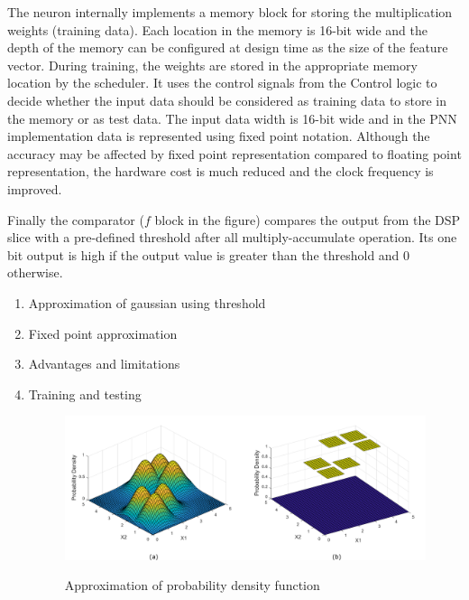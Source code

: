 The neuron internally implements a memory block for storing the multiplication weights (training data).
Each location in the memory is 16-bit wide and the depth of the memory can be configured at design time as the size of the feature vector.
During training, the weights are stored in the appropriate memory location by the scheduler.
It uses the control signals from the Control logic to decide whether the input data should be considered as training data to store in the memory or as test data.
The input data width is 16-bit wide and in the PNN implementation data is represented using fixed point notation.
Although the accuracy may be affected by fixed point representation compared to floating point representation, the hardware cost is much reduced and the clock frequency is improved.

Finally the comparator ($f$ block in the figure) compares the output from the DSP slice with a pre-defined threshold after all multiply-accumulate operation.
Its one bit output is high if the output value is greater than the threshold and 0 otherwise.



\begin{enumerate}
\item Approximation of gaussian using threshold
\item Fixed point approximation
\item Advantages and limitations
\item Training and testing





\begin{figure}[t]
\centering
   \includegraphics[height=0.4\columnwidth]{Figures/pdf.pdf}
   \label{fig:pdf}
   \caption{Approximation of probability density function}
\end{figure}


\end{enumerate}